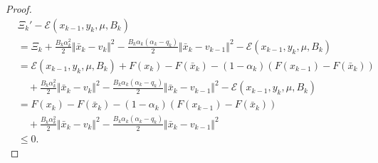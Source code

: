 \documentclass[12pt]{article}
\begin{document}
\begin{proof}
            \begin{align*}
                & \Xi_k' - \mathcal E(x_{k - 1}, y_k, \mu, B_k) 
                \\
                &= 
                \Xi_k 
                + \frac{B_k\alpha_k^2}{2}\Vert \bar x_k - v_k\Vert^2 
                - \frac{B_k\alpha_k(\alpha_k - q_k)}{2}\Vert \bar x_k - v_{k - 1}\Vert^2
                - \mathcal E(x_{k - 1}, y_k, \mu, B_k) 
                \\
                &= \mathcal E(x_{k - 1}, y_k, \mu, B_k)
                + F(x_k) - F(\bar x_k)
                - (1 - \alpha_k)(F(x_{k - 1}) - F(\bar x_k))
                    \\ &\quad 
                    + \frac{B_k\alpha_k^2}{2}\Vert \bar x_k - v_k\Vert^2 
                    - \frac{B_k\alpha_k(\alpha_k - q_k)}{2}\Vert \bar x_k - v_{k - 1}\Vert^2
                    - \mathcal E(x_{k - 1}, y_k, \mu, B_k)
                \\
                &=  
                F(x_k) - F(\bar x_k)
                - (1 - \alpha_k)(F(x_{k - 1}) - F(\bar x_k))
                    \\ &\quad 
                    + \frac{B_k\alpha_k^2}{2}\Vert \bar x_k - v_k\Vert^2 
                    - \frac{B_k\alpha_k(\alpha_k - q_k)}{2}\Vert \bar x_k - v_{k - 1}\Vert^2
                \\
                &\le 0. 
            \end{align*}
        \end{proof}
\end{document}
